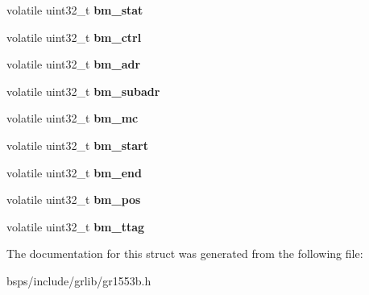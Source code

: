\begin{DoxyCompactItemize}
volatile uint32\+\_\+t {\bfseries bm\+\_\+stat}
\item 
\mbox{\label{structgr1553b__regs_ac426d9b5f5e597ecd04b61834dddd47b}} 
volatile uint32\+\_\+t {\bfseries bm\+\_\+ctrl}
\item 
\mbox{\label{structgr1553b__regs_a7d16a514f7eb12c6e52d2d34ae702a8f}} 
volatile uint32\+\_\+t {\bfseries bm\+\_\+adr}
\item 
\mbox{\label{structgr1553b__regs_a0e5901ebb3e1021353e93f0ee3efc83f}} 
volatile uint32\+\_\+t {\bfseries bm\+\_\+subadr}
\item 
\mbox{\label{structgr1553b__regs_a0ce9aa4d2426f6341f826f59d5f37c2e}} 
volatile uint32\+\_\+t {\bfseries bm\+\_\+mc}
\item 
\mbox{\label{structgr1553b__regs_a18559790a8cf402114298d8696e5db8b}} 
volatile uint32\+\_\+t {\bfseries bm\+\_\+start}
\item 
\mbox{\label{structgr1553b__regs_adb726f84f8485502f4e06e560b5199f9}} 
volatile uint32\+\_\+t {\bfseries bm\+\_\+end}
\item 
\mbox{\label{structgr1553b__regs_ad9f6ef0e790ba94d19858ab848ebbcdc}} 
volatile uint32\+\_\+t {\bfseries bm\+\_\+pos}
\item 
\mbox{\label{structgr1553b__regs_ae74e659fd3991444b7553c767132b147}} 
volatile uint32\+\_\+t {\bfseries bm\+\_\+ttag}
\end{DoxyCompactItemize}


The documentation for this struct was generated from the following file\+:\begin{DoxyCompactItemize}
\item 
bsps/include/grlib/gr1553b.\+h\end{DoxyCompactItemize}
